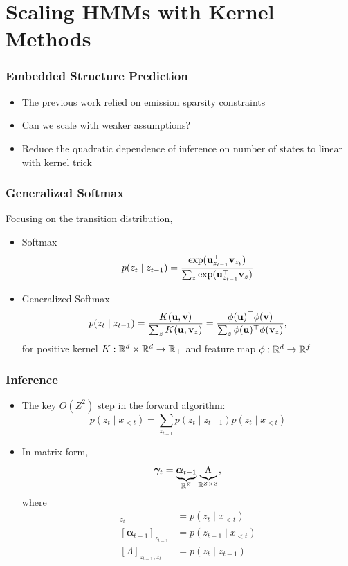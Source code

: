 \documentclass{beamer}
\begin{document}
\section{Scaling HMMs with Kernel Methods}

\begin{frame}
\frametitle{Embedded Structure Prediction}
\begin{itemize}
\item The previous work relied on emission sparsity constraints
\vspace{2em}
\item Can we scale with weaker assumptions?
\vspace{2em}
\item Reduce the quadratic dependence of inference on number of states
    to linear with kernel trick
\end{itemize}
\end{frame}

\begin{frame}
\frametitle{Generalized Softmax}
Focusing on the transition distribution,
\vspace{1em}
\begin{itemize}
\item Softmax
$$p(z_t \mid z_{t-1}) = \frac{\exp(\mathbf{u}_{z_{t-1}}^\top \mathbf{v}_{z_{t}})}
{\sum_z \exp(\mathbf{u}_{z_{t-1}}^\top \mathbf{v}_z)}$$
\vspace{1em}
\item Generalized Softmax
$$p(z_t \mid z_{t-1})
= \frac{K(\mathbf{u}, \mathbf{v})}{\sum_z K(\mathbf{u},\mathbf{v}_z)}
= \frac{\phi(\mathbf{u})^\top\phi(\mathbf{v})}
    {\sum_z \phi(\mathbf{u})^\top\phi(\mathbf{v}_z)},$$
for positive kernel $K:\mathbb{R}^d\times\mathbb{R}^d\to\mathbb{R}_+$
and feature map $\phi:\mathbb{R}^d\to\mathbb{R}^f$
\end{itemize}
\end{frame}

\begin{frame}
\frametitle{Inference}
\begin{itemize}
\item The key $O(Z^2)$ step in the forward algorithm:
$$
p(z_t \mid x_{<t}) = \sum_{z_{t-1}} p(z_t \mid z_{t-1})p(z_t \mid x_{<t})
$$
\vspace{1em}
\item In matrix form, 
\begin{equation*}
\bm\gamma_t = \underbrace{\bm\alpha_{t-1}}_{\mathbb{R}^Z}\underbrace{\Lambda_{}}_{\mathbb{R}^{Z \times Z}},
\end{equation*}
where
\begin{align*}
[\bm\gamma_{t}]_{z_{t}} &= p(z_{t} \mid x_{< t})\\
[\bm\alpha_{t-1}]_{z_{t-1}} &= p(z_{t-1} \mid x_{< t})\\
[\Lambda]_{z_{t-1},z_t} &= p(z_t\mid z_{t-1})
\end{align*}
\end{itemize}
\end{frame}
\end{document}
